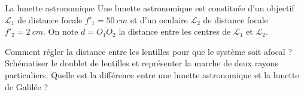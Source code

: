 \begin{exo}[1][TD]{La lunette astronomique}
Une lunette astronomique est constituée d'un objectif $\mathcal{L}_{1}$  de distance focale $f'_{1}=\SI{50}{cm}$ et d'un oculaire $\mathcal{L}_{2}$ de distance focale $f'_{2}=\SI{2}{cm}$. On note $d=\overline{O_1O_2}$ la distance entre les centres de $\mathcal{L}_1$ et $\mathcal{L}_2$.

\begin{questions}
	\item Comment régler la distance entre les lentilles pour que le système soit afocal ? Schématiser le doublet de lentilles et représenter la marche de deux rayons particuliers. Quelle est la différence entre  une lunette astronomique et la lunette de Galilée ?

\end{questions}
\end{exo}

